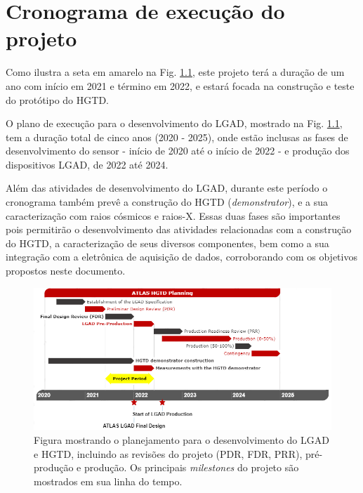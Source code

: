 \chapter{Cronograma de execução do projeto}

Como ilustra a seta em amarelo na Fig. \ref{crono}, este projeto terá a duração de um ano com início em 2021 e término em 2022, e estará focada na construção e teste do protótipo do HGTD. 

O plano de execução para o desenvolvimento do LGAD, mostrado na Fig. \ref{crono}, tem a duração total de cinco anos (2020 - 2025), onde estão inclusas as fases de desenvolvimento do sensor - início de 2020 até o início de 2022 - e produção dos dispositivos LGAD, de 2022 até 2024. 
\thispagestyle{plain}

Além das atividades de desenvolvimento do LGAD, durante este período o cronograma também prevê a construção do HGTD (\textit{demonstrator}), e a sua caracterização com raios cósmicos e raios-X. Essas duas fases são importantes pois permitirão o desenvolvimento das atividades relacionadas com a construção do HGTD, a caracterização de seus diversos componentes, bem como a sua integração com a eletrônica de aquisição de dados, corroborando com os objetivos propostos neste documento. 

\begin{figure}[H]
    \centering 
    \includegraphics[width=16.0cm]{assets/cronogama.png}
    \caption{Figura mostrando o planejamento para o desenvolvimento do LGAD e HGTD, incluindo as revisões do projeto (PDR, FDR, PRR), pré-produção e produção. Os principais {\it milestones} do projeto são mostrados em sua linha do tempo.}
    \label{crono}
\end{figure}

\renewcommand{\cleardoublepage}{}
\renewcommand{\clearpage}{}